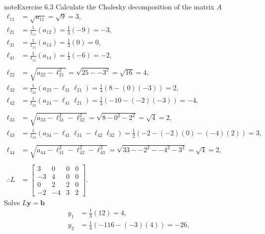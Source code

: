 \documentclass[letterpaper,10pt,english]{jupyterBook}
\begin{document}
\begin{sphinxadmonition}{note}{Exercise 6.3}
\sphinxAtStartPar
Calculate the Cholesky decomposition of the matrix \(A\)
\begin{align*}
    \ell_{11} &= \sqrt{ a_{11} } = \sqrt{ 9 } = 3, \\
    \ell_{21} &= \frac{1}{\ell_{11}} \left( a_{12} \right) = \frac{1}{3} \left( -9 \right) = -3, \\
    \ell_{31} &= \frac{1}{\ell_{11}} \left( a_{13} \right) = \frac{1}{3} \left( 0 \right) = 0, \\
    \ell_{41} &= \frac{1}{\ell_{11}} \left( a_{14} \right) = \frac{1}{3} \left( -6 \right) = -2, \\
    \\
    \ell_{22} &= \sqrt{ a_{22} - \ell_{21}^2 } = \sqrt{ 25 - -3^2 } = \sqrt{ 16 } = 4, \\
    \ell_{32} &= \frac{1}{\ell_{22}} \left( a_{23} - \ell_{31} \ell_{21} \right) = \frac{1}{4} \left( 8 - \left( 0 \right) \left( -3 \right) \right) = 2, \\
    \ell_{42} &= \frac{1}{\ell_{22}} \left( a_{24} - \ell_{41} \ell_{21} \right) = \frac{1}{4} \left( -10 - \left( -2 \right) \left( -3 \right) \right) = -4, \\
    \\
    \ell_{33} &= \sqrt{ a_{33} - \ell_{31}^2 - \ell_{32}^2 } = \sqrt{ 8 - 0^2 - 2^2 } = \sqrt{ 4 } = 2, \\
    \ell_{43} &= \frac{1}{\ell_{33}} \left( a_{34} - \ell_{41} \ell_{31} - \ell_{42} \ell_{32} \right) = \frac{1}{2} \left( -2 - \left( -2 \right) \left( 0 \right) - \left( -4 \right) \left( 2 \right) \right) = 3, \\
    \\
    \ell_{44} &= \sqrt{ a_{44} - \ell_{41}^2 - \ell_{42}^2 - \ell_{43}^2 } = \sqrt{ 33 - -2^2 - -4^2 - 3^2 } = \sqrt{ 4 } = 2, \\
    \\
    \therefore L &= \left[\begin{matrix}3 & 0 & 0 & 0\\-3 & 4 & 0 & 0\\0 & 2 & 2 & 0\\-2 & -4 & 3 & 2\end{matrix}\right].
\end{align*}
\sphinxAtStartPar
Solve \(L \mathbf{y} = \mathbf{b}\)
\begin{align*}
    y_{1} &= \frac{1}{3} \left( 12\right) = 4, \\
    y_{2} &= \frac{1}{4} \left( -116 - \left( -3 \right) \left( 4 \right)\right) = -26, \\

\end{align*}
\end{sphinxadmonition}
\end{document}
